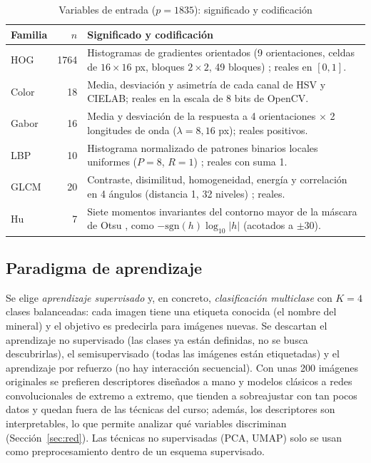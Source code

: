 \documentclass[journal]{IEEEtran}
\begin{document}
\begin{table}[!t]
\caption{Variables de entrada ($p=1835$): significado y codificación}
\label{tab:vars}
\centering\footnotesize
\setlength{\tabcolsep}{3pt}
\renewcommand{\arraystretch}{1.05}
\begin{tabular}{@{}l r p{5.4cm}@{}}
\toprule
Familia & $n$ & Significado y codificación\\
\midrule
HOG & 1764 & Histogramas de gradientes orientados (9 orientaciones, celdas de $16\times16$ px, bloques $2\times2$, 49 bloques) \cite{dalal2005}; reales en $[0,1]$.\\
Color & 18 & Media, desviación y asimetría de cada canal de HSV y CIELAB; reales en la escala de 8 bits de OpenCV.\\
Gabor & 16 & Media y desviación de la respuesta a 4 orientaciones $\times$ 2 longitudes de onda ($\lambda=8,16$ px); reales positivos.\\
LBP & 10 & Histograma normalizado de patrones binarios locales uniformes ($P=8$, $R=1$) \cite{ojala2002}; reales con suma 1.\\
GLCM & 20 & Contraste, disimilitud, homogeneidad, energía y correlación en 4 ángulos (distancia 1, 32 niveles) \cite{haralick1973}; reales.\\
Hu & 7 & Siete momentos invariantes del contorno mayor de la máscara de Otsu \cite{hu1962}, como $-\mathrm{sgn}(h)\log_{10}|h|$ (acotados a $\pm30$).\\
\bottomrule
\end{tabular}
\end{table}

\subsection{Paradigma de aprendizaje}
Se elige \emph{aprendizaje supervisado} y, en concreto, \emph{clasificación multiclase} con $K=4$ clases balanceadas: cada imagen tiene una etiqueta conocida (el nombre del mineral) y el objetivo es predecirla para imágenes nuevas. Se descartan el aprendizaje no supervisado (las clases ya están definidas, no se busca descubrirlas), el semisupervisado (todas las imágenes están etiquetadas) y el aprendizaje por refuerzo (no hay interacción secuencial). Con unas 200 imágenes originales se prefieren descriptores diseñados a mano y modelos clásicos a redes convolucionales de extremo a extremo, que tienden a sobreajustar con tan pocos datos y quedan fuera de las técnicas del curso; además, los descriptores son interpretables, lo que permite analizar qué variables discriminan (Sección~\ref{sec:red}). Las técnicas no supervisadas (PCA, UMAP) solo se usan como preprocesamiento dentro de un esquema supervisado.
\end{document}
